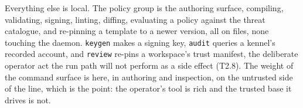 Everything else is local. The policy group is the authoring surface,
compiling, validating, signing, linting, diffing, evaluating a policy
against the threat catalogue, and re-pinning a template to a newer
version, all on files, none touching the daemon. \texttt{keygen} makes a
signing key, \texttt{audit} queries a kennel's recorded account, and
\texttt{review} re-pins a workspace's trust manifest, the deliberate
operator act the run path will not perform as a side effect (T2.8). The
weight of the command surface is here, in authoring and inspection, on
the untrusted side of the line, which is the point: the operator's tool
is rich and the trusted base it drives is not.
